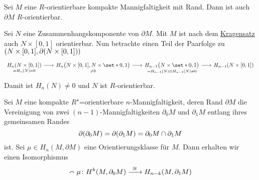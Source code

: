 \begin{lemma}[{name=[Orientierbarkeit des Randes]}]
	Sei $M$ eine $R$-orientierbare kompakte Mannigfaltigkeit mit Rand.
	Dann ist auch $\partial M$ $R$-orientierbar.
\end{lemma}
\begin{beweis}
	Sei $N$ eine Zusammenhangskomponente von $\partial M$.
	Mit $M$ ist nach dem \hyperref[kragensatz]{Kragensatz} auch $N \times [0,1]$ orientierbar.
	Nun betrachte einen Teil der Paarfolge zu $\enbrace*{N \times [0,1], \partial (N \times [0,1])}$
	\[
		\begin{tikzcd}[sep=1.8em]
			\underset{=H_n(N)=0}{H_n(N \times [0,1])} \rar & \underset{\neq 0}{H_n \enbrace[\big]{N \times [0,1], N \times \set*{0,1}}} \rar & \underset{= H_{n-1}(N) \oplus H_{n-1}(N) \neq 0}{H_{n-1} \enbrace[\big]{N \times \set*{0,1}}} \rar & H_{n-1} \enbrace*{N \times [0,1]}
		\end{tikzcd}
	\]
	Damit ist $H_n(N)\neq 0$ und $N$ ist $R$-orientierbar.
\end{beweis}
\begin{satz}[{name={Poincaré-Dualität für Mannigfaltigkeiten mit Rand}}]
	Sei $M$ eine kompakte $R$"=orientierbare $n$-Mannigfaltigkeit, deren Rand $\partial M$ die Vereinigung von zwei $(n-1)$-Mannigfaltigkeiten $\partial_0 M$ und $\partial_1 M$ entlang ihres gemeinsamen Randes 
	\[
		\partial \enbrace*{\partial_0 M } = \partial \enbrace*{\partial_1 M} = \partial_0 M \cap \partial_1 M
	\]
	ist.
	Sei $\mu \in H_n(M, \partial M)$ eine Orientierungsklasse für $M$. 
	Dann erhalten wir einen Isomorphismus 
	\[
		\capp \mu \colon H^k \enbrace*{M, \partial_0 M} \grenzw{\cong} H_{n-k} \enbrace*{M, \partial_1 M}
	\]
\end{satz}

